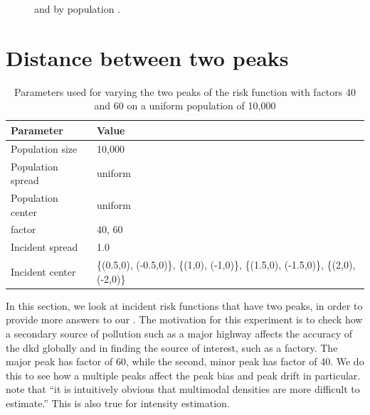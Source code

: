 \begin{figure}[htbp]
\begin{subfigure}[t]{0.49\textwidth}
        \label{fig:other_measures:pop_spread:maxerr}
    \end{subfigure}
    \caption[ and  by population ]
        { and  by population . \errorplotcaption}
    \label{fig:other_measures:pop_spread}
\end{figure}

\section{Distance between two peaks}
\label{sec:results:p1.4_100_G}

\begin{table}[htbp]
    \centering
    \begin{tabular}{ll}
        \toprule
        Parameter & Value \\
        \midrule
        Population size & 10,000 \\
        Population \gls{spread} & uniform \\
        Population center & uniform \\
        \Gls{factor} & 40, 60 \\
        Incident \gls{spread} & 1.0 \\
        Incident center & \{(0.5,0), (-0.5,0)\},  \{(1,0), (-1,0)\}, \{(1.5,0), (-1.5,0)\}, \{(2,0), (-2,0)\}\\
        \bottomrule
    \end{tabular}
    \caption[Parameters used for varying the two peaks of the risk function]
        {Parameters used for varying the two peaks of the risk function with \glspl{factor} 40 and 60 on a uniform population of 10,000}
    \label{tab:params:p1.4_100_G}
\end{table}

In this section, we look at incident risk functions that have two peaks,
in order to provide more answers to our .
The motivation for this experiment is to check how a secondary source of pollution such as a major highway affects the accuracy of the \gls{dkd}
globally and in finding the source of interest, such as a factory.
The major peak has \gls{factor} of 60, while the second, minor peak has \gls{factor} of 40.
We do this to see how a multiple peaks affect the \gls{peak bias} and \gls{peak drift} in particular.
\citet{devroye1985nonparametric} note that ``it is intuitively obvious that multimodal densities are more difficult to estimate.''
This is also true for intensity estimation.

